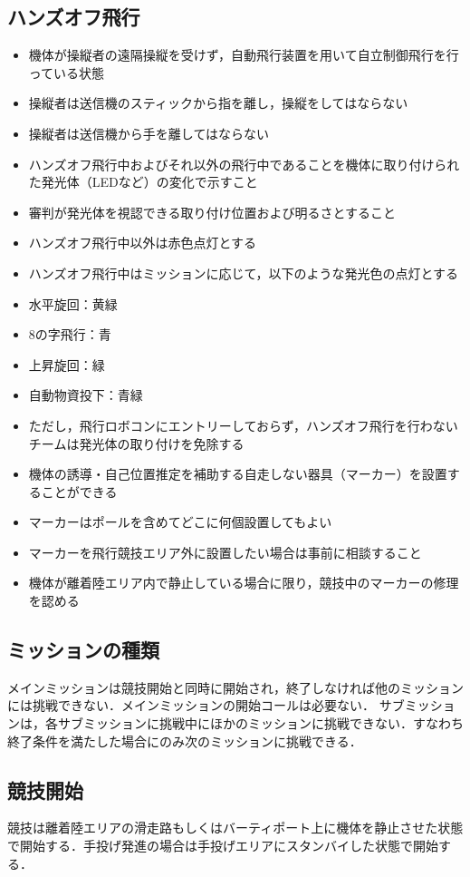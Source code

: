 \documentclass[a4paper,12pt,oneside]{jsarticle}
\begin{document}
\subsection{ハンズオフ飛行}
\begin{itemize}
  \item 機体が操縦者の遠隔操縦を受けず，自動飛行装置を用いて自立制御飛行を行っている状態
  \item 操縦者は送信機のスティックから指を離し，操縦をしてはならない
  \item 操縦者は送信機から手を離してはならない
  \item ハンズオフ飛行中およびそれ以外の飛行中であることを機体に取り付けられた発光体（LEDなど）の変化で示すこと
  \item 審判が発光体を視認できる取り付け位置および明るさとすること
  \item ハンズオフ飛行中以外は赤色点灯とする
  \item ハンズオフ飛行中はミッションに応じて，以下のような発光色の点灯とする
  \item 水平旋回：黄緑
  \item 8の字飛行：青
  \item 上昇旋回：緑
  \item 自動物資投下：青緑
  \item ただし，飛行ロボコンにエントリーしておらず，ハンズオフ飛行を行わないチームは発光体の取り付けを免除する
  \item 機体の誘導・自己位置推定を補助する自走しない器具（マーカー）を設置することができる
  \item マーカーはポールを含めてどこに何個設置してもよい
  \item マーカーを飛行競技エリア外に設置したい場合は事前に相談すること
  \item 機体が離着陸エリア内で静止している場合に限り，競技中のマーカーの修理を認める
\end{itemize}

\subsection{ミッションの種類}
メインミッションは競技開始と同時に開始され，終了しなければ他のミッションには挑戦できない．メインミッションの開始コールは必要ない．
サブミッションは，各サブミッションに挑戦中にほかのミッションに挑戦できない．すなわち終了条件を満たした場合にのみ次のミッションに挑戦できる．

\subsection{競技開始}
競技は離着陸エリアの滑走路もしくはバーティポート上に機体を静止させた状態で開始する．手投げ発進の場合は手投げエリアにスタンバイした状態で開始する．
\end{document}
